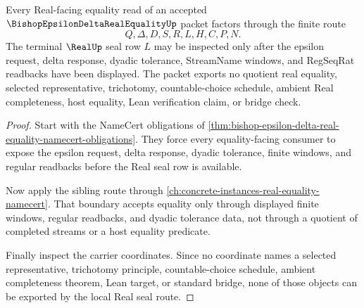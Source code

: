 \begin{theorem}
\label{thm:bishop-epsilon-delta-real-equality-real-seal-nonescape}
Every Real-facing equality read of an accepted $\BishopEpsilonDeltaRealEqualityUp$ packet factors through the finite route
$$
Q,\Delta,D,S,R,L,H,C,P,N.
$$
The terminal $\RealUp$ seal row $L$ may be inspected only after the epsilon request, delta response, dyadic tolerance, StreamName windows, and RegSeqRat readbacks have been displayed. The packet exports no quotient real equality, selected representative, trichotomy, countable-choice schedule, ambient Real completeness, host equality, Lean verification claim, or bridge check.
\end{theorem}
\begin{proof}
Start with the NameCert obligations of \autoref{thm:bishop-epsilon-delta-real-equality-namecert-obligations}. They force every equality-facing consumer to expose the epsilon request, delta response, dyadic tolerance, finite windows, and regular readbacks before the Real seal row is available.

Now apply the sibling route through \autoref{ch:concrete-instances-real-equality-namecert}. That boundary accepts equality only through displayed finite windows, regular readbacks, and dyadic tolerance data, not through a quotient of completed streams or a host equality predicate.

Finally inspect the carrier coordinates. Since no coordinate names a selected representative, trichotomy principle, countable-choice schedule, ambient completeness theorem, Lean target, or standard bridge, none of those objects can be exported by the local Real seal route.
\end{proof}


\begin{closurestatus}{\BishopEpsilonDeltaRealEqualityUp}
  \theoryclosure{\seedClosure}
  \formalstatus{\unformalizedV}
\end{closurestatus}
